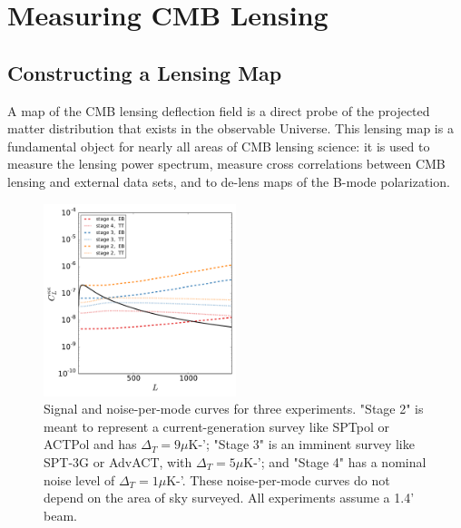 \section{Measuring CMB Lensing}

\subsection{Constructing a Lensing Map}\label{kappaMap}

A map of the CMB lensing deflection field is a direct probe of the projected matter distribution that exists in the observable Universe. This lensing map is a fundamental object for nearly all areas of CMB lensing science: it is used to measure the lensing power spectrum, measure cross correlations between CMB lensing and external data sets, and to de-lens maps of the B-mode polarization.  

\begin{figure}[htbp]
\centering
\includegraphics[width=0.5\textwidth]{CMBLensing/n0s_s4.pdf}
\caption{Signal and noise-per-mode curves for three experiments. "Stage 2" is meant to represent a current-generation survey like SPTpol or ACTPol and has $\Delta_T = 9 \mu$K-';  "Stage 3" is an imminent survey like SPT-3G or AdvACT, with $\Delta_T = 5 \mu$K-'; and "Stage 4" has a nominal noise level of  $\Delta_T = 1 \mu$K-'.   These noise-per-mode curves do not depend on the area of sky surveyed.  All experiments assume a 1.4' beam.   }
\label{n0s_s4}
\end{figure}



